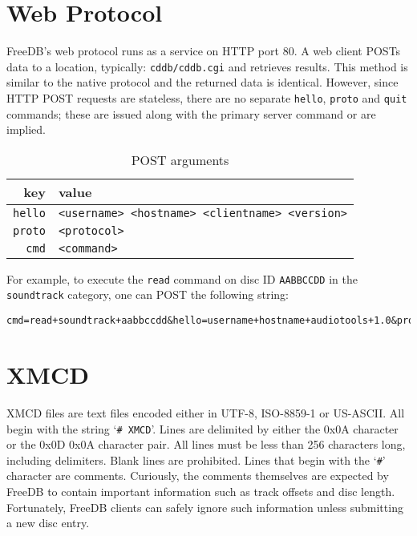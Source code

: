 \pagebreak

\section{Web Protocol}
FreeDB's web protocol runs as a service on HTTP port 80.
A web client POSTs data to a location, typically: \texttt{cddb/cddb.cgi}
and retrieves results.
This method is similar to the native protocol and the returned
data is identical.
However, since HTTP POST requests are stateless,
there are no separate \texttt{hello}, \texttt{proto} and \texttt{quit}
commands; these are issued along with the primary server command or are
implied.
\begin{table}[h]
\begin{tabular}{|r|l|}
\hline
key & value \\
\hline
\texttt{hello} &
\texttt{<username> <hostname> <clientname> <version>} \\
\texttt{proto} &
\texttt{<protocol>} \\
\texttt{cmd} &
\texttt{<command>} \\
\hline
\end{tabular}
\caption{POST arguments}
\end{table}
\par
\noindent
For example, to execute the \texttt{read} command on disc ID \texttt{AABBCCDD}
in the \texttt{soundtrack} category, one can POST the following string:
\begin{Verbatim}[frame=single]
cmd=read+soundtrack+aabbccdd&hello=username+hostname+audiotools+1.0&proto=6
\end{Verbatim}

\section{XMCD}

XMCD files are text files encoded either in UTF-8, ISO-8859-1 or
US-ASCII.
All begin with the string `\texttt{\# XMCD}'.
Lines are delimited by either the 0x0A character
or the 0x0D 0x0A character pair.
All lines must be less than 256 characters long,
including delimiters.
Blank lines are prohibited.
Lines that begin with the `\texttt{\#}' character are comments.
Curiously, the comments themselves are expected by FreeDB to contain
important information such as track offsets and disc length.
Fortunately, FreeDB clients can safely ignore such information
unless submitting a new disc entry.


